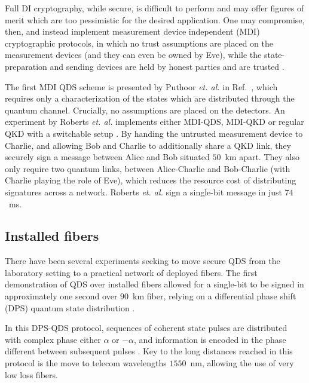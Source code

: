 Full DI cryptography, while secure, is difficult to perform and may offer figures of merit which are too pessimistic for the desired application. One may compromise, then, and instead implement measurement device independent (MDI) cryptographic protocols, in which no trust assumptions are placed on the measurement devices (and they can even be owned by Eve), while the state-preparation and sending devices are held by honest parties and are trusted \cite{Lo2012}.

The first MDI QDS scheme is presented by Puthoor \emph{et. al.} in Ref.~\cite{Puthoor2016}, which requires only a characterization of the states which are distributed through the quantum channel. Crucially, no assumptions are placed on the detectors. An experiment by Roberts \emph{et. al.} implements either MDI-QDS, MDI-QKD or regular QKD with a switchable setup \cite{Roberts2017}. By handing the untrusted measurement device to Charlie, and allowing Bob and Charlie to additionally share a QKD link, they securely sign a message between Alice and Bob situated $50$~km apart. They also only require two quantum links, between Alice-Charlie and Bob-Charlie (with Charlie playing the role of Eve), which reduces the resource cost of distributing signatures across a network. Roberts \emph{et. al.} sign a single-bit message in just $74$~ms. %





\subsection{Installed fibers}
There have been several experiments seeking to move secure QDS from the laboratory setting to a practical network of deployed fibers. The first demonstration of QDS over installed fibers \cite{Collins2016} allowed for a single-bit to be signed in approximately one second over $90$~km fiber, relying on a differential phase shift (DPS) quantum state distribution \cite{Inoue2002}.

In this DPS-QDS protocol, sequences of coherent state pulses are distributed with complex phase either $\alpha$ or $- \alpha$, and information is encoded in the phase different between subsequent pulses \cite{Inoue2015}. Key to the long distances reached in this protocol is the move to telecom wavelengths $1550$~nm, allowing the use of very low loss fibers. 


